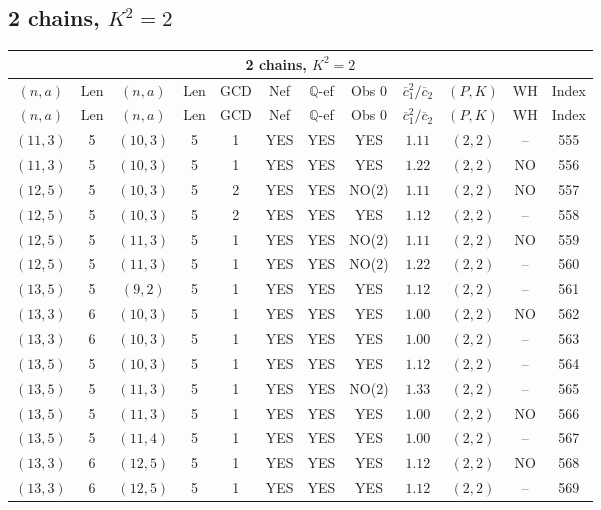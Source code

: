 \subsection{2 chains, $K^2 = 2$}
\begin{longtable}{|c|c|c|c|c|c|c|c|c|c|c|c|}
\hline
\multicolumn{12}{|c|}{2 chains, $K^2 = 2$}\\
\hline
$(n,a)$ & Len & $(n,a)$ & Len & GCD & Nef & $\mathbb Q$-ef & Obs 0 & $\overline c_1^2 / \overline c_2$ & $(P,K)$ & WH & Index\\
\hline
\endfirsthead

\hline
$(n,a)$ & Len & $(n,a)$ & Len & GCD & Nef & $\mathbb Q$-ef & Obs 0 & $\overline c_1^2 / \overline c_2$ & $(P,K)$ & WH & Index\\
\hline
\endhead
\hline
\endfoot

$(11,3)$ & 5 & $(10,3)$ & 5 & 1 & YES & YES & YES & $1.11$ & $(2,2)$ & -- & 555\\
$(11,3)$ & 5 & $(10,3)$ & 5 & 1 & YES & YES & YES & $1.22$ & $(2,2)$ & NO & 556\\
$(12,5)$ & 5 & $(10,3)$ & 5 & 2 & YES & YES & NO(2) & $1.11$ & $(2,2)$ & NO & 557\\
$(12,5)$ & 5 & $(10,3)$ & 5 & 2 & YES & YES & YES & $1.12$ & $(2,2)$ & -- & 558\\
$(12,5)$ & 5 & $(11,3)$ & 5 & 1 & YES & YES & NO(2) & $1.11$ & $(2,2)$ & NO & 559\\
$(12,5)$ & 5 & $(11,3)$ & 5 & 1 & YES & YES & NO(2) & $1.22$ & $(2,2)$ & -- & 560\\
$(13,5)$ & 5 & $(9,2)$ & 5 & 1 & YES & YES & YES & $1.12$ & $(2,2)$ & -- & 561\\
$(13,3)$ & 6 & $(10,3)$ & 5 & 1 & YES & YES & YES & $1.00$ & $(2,2)$ & NO & 562\\
$(13,3)$ & 6 & $(10,3)$ & 5 & 1 & YES & YES & YES & $1.00$ & $(2,2)$ & -- & 563\\
$(13,5)$ & 5 & $(10,3)$ & 5 & 1 & YES & YES & YES & $1.12$ & $(2,2)$ & -- & 564\\
$(13,5)$ & 5 & $(11,3)$ & 5 & 1 & YES & YES & NO(2) & $1.33$ & $(2,2)$ & -- & 565\\
$(13,5)$ & 5 & $(11,3)$ & 5 & 1 & YES & YES & YES & $1.00$ & $(2,2)$ & NO & 566\\
$(13,5)$ & 5 & $(11,4)$ & 5 & 1 & YES & YES & YES & $1.00$ & $(2,2)$ & -- & 567\\
$(13,3)$ & 6 & $(12,5)$ & 5 & 1 & YES & YES & YES & $1.12$ & $(2,2)$ & NO & 568\\
$(13,3)$ & 6 & $(12,5)$ & 5 & 1 & YES & YES & YES & $1.12$ & $(2,2)$ & -- & 569\\

\end{longtable}
